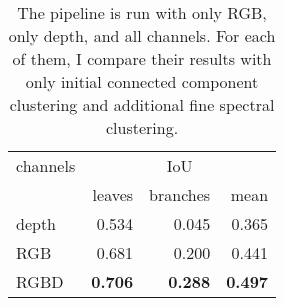 \begin{table}[t]
    \centering
    \begin{tabular}{lrrr}
    \toprule
    channels  & \multicolumn{3}{c}{IoU}\\
     & leaves & branches & mean\\
    \midrule
    depth  & 0.534 & 0.045 & 0.365\\
    RGB  & 0.681 & 0.200 & 0.441\\
    RGBD  & \textbf{0.706} & \textbf{0.288} & \textbf{0.497}\\
    \bottomrule
    \end{tabular}
    \caption{The pipeline is run with only RGB, only depth, and all channels. For each of them, I compare their results with only initial connected component clustering and additional fine spectral clustering.}
    \label{tab:segmentation_results}
\end{table}